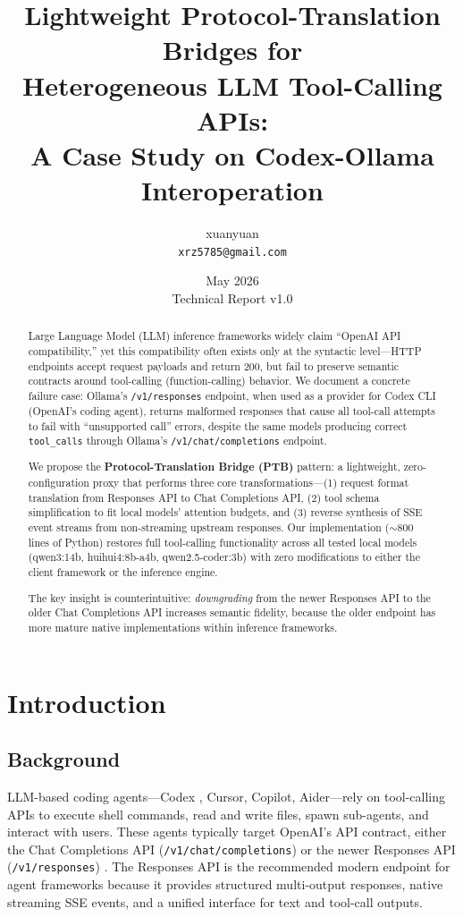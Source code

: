 \documentclass[11pt,a4paper]{article}
\title{\bf Lightweight Protocol-Translation Bridges for\\
Heterogeneous LLM Tool-Calling APIs:\\
A Case Study on Codex-Ollama Interoperation}
\author{
  xuanyuan\\
  \texttt{xrz5785@gmail.com}
}
\date{May 2026\\Technical Report v1.0}
\begin{document}
\maketitle

\begin{abstract}
Large Language Model (LLM) inference frameworks widely claim ``OpenAI API
compatibility,'' yet this compatibility often exists only at the syntactic
level---HTTP endpoints accept request payloads and return 200, but fail to
preserve semantic contracts around tool-calling (function-calling) behavior.
We document a concrete failure case: Ollama's \texttt{/v1/responses}
endpoint, when used as a provider for Codex CLI (OpenAI's coding agent),
returns malformed responses that cause all tool-call attempts to fail with
``unsupported call'' errors, despite the same models producing correct
\texttt{tool\_calls} through Ollama's \texttt{/v1/chat/completions}
endpoint.

We propose the \textbf{Protocol-Translation Bridge (PTB)} pattern: a
lightweight, zero-configuration proxy that performs three core
transformations---(1) request format translation from Responses API to Chat
Completions API, (2) tool schema simplification to fit local models'
attention budgets, and (3) reverse synthesis of SSE event streams from
non-streaming upstream responses. Our implementation ($\sim$800 lines of
Python) restores full tool-calling functionality across all tested local
models (qwen3:14b, huihui4:8b-a4b, qwen2.5-coder:3b) with zero
modifications to either the client framework or the inference engine.

The key insight is counterintuitive: \textit{downgrading} from the newer
Responses API to the older Chat Completions API increases semantic fidelity,
because the older endpoint has more mature native implementations within
inference frameworks.
\end{abstract}

\section{Introduction}

\subsection{Background}

LLM-based coding agents---Codex \cite{codex}, Cursor, Copilot,
Aider---rely on tool-calling APIs to execute shell commands, read and write
files, spawn sub-agents, and interact with users. These agents typically
target OpenAI's API contract, either the Chat Completions API
(\texttt{/v1/chat/completions}) or the newer Responses API
(\texttt{/v1/responses}) \cite{openai_responses}. The Responses API is the
recommended modern endpoint for agent frameworks because it provides
structured multi-output responses, native streaming SSE events, and a
unified interface for text and tool-call outputs.
\end{document}
